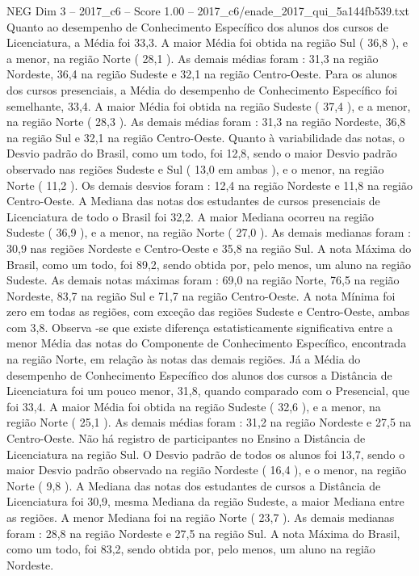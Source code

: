 \begin{textsample}{NEG Dim 3 – 2017\_c6 – Score 1.00 – 2017\_c6/enade\_2017\_qui\_5a144fb539.txt}
Quanto ao desempenho de Conhecimento Específico dos alunos dos cursos de Licenciatura, a Média foi 33,3.
A maior Média foi obtida na região Sul ( 36,8 ), e a menor, na região Norte ( 28,1 ).
As demais médias foram : 31,3 na região Nordeste, 36,4 na região Sudeste e 32,1 na região Centro-Oeste.
Para os alunos dos cursos presenciais, a Média do desempenho de Conhecimento Específico foi semelhante, 33,4.
A maior Média foi obtida na região Sudeste ( 37,4 ), e a menor, na região Norte ( 28,3 ).
As demais médias foram : 31,3 na região Nordeste, 36,8 na região Sul e 32,1 na região Centro-Oeste.
Quanto à variabilidade das notas, o Desvio padrão do Brasil, como um todo, foi 12,8, sendo o maior Desvio padrão observado nas regiões Sudeste e Sul ( 13,0 em ambas ), e o menor, na região Norte ( 11,2 ).
Os demais desvios foram : 12,4 na região Nordeste e 11,8 na região Centro-Oeste.
A Mediana das notas dos estudantes de cursos presenciais de Licenciatura de todo o Brasil foi 32,2.
A maior Mediana ocorreu na região Sudeste ( 36,9 ), e a menor, na região Norte ( 27,0 ).
As demais medianas foram : 30,9 nas regiões Nordeste e Centro-Oeste e 35,8 na região Sul.
A nota Máxima do Brasil, como um todo, foi 89,2, sendo obtida por, pelo menos, um aluno na região Sudeste.
As demais notas máximas foram : 69,0 na região Norte, 76,5 na região Nordeste, 83,7 na região Sul e 71,7 na região Centro-Oeste.
A nota Mínima foi zero em todas as regiões, com exceção das regiões Sudeste e Centro-Oeste, ambas com 3,8.
Observa -se que existe diferença estatisticamente significativa entre a menor Média das notas do Componente de Conhecimento Específico, encontrada na região Norte, em relação às notas das demais regiões.
Já a Média do desempenho de Conhecimento Específico dos alunos dos cursos a Distância de Licenciatura foi um pouco menor, 31,8, quando comparado com o Presencial, que foi 33,4.
A maior Média foi obtida na região Sudeste ( 32,6 ), e a menor, na região Norte ( 25,1 ).
As demais médias foram : 31,2 na região Nordeste e 27,5 na Centro-Oeste.
Não há registro de participantes no Ensino a Distância de Licenciatura na região Sul.
O Desvio padrão de todos os alunos foi 13,7, sendo o maior Desvio padrão observado na região Nordeste ( 16,4 ), e o menor, na região Norte ( 9,8 ).
A Mediana das notas dos estudantes de cursos a Distância de Licenciatura foi 30,9, mesma Mediana da região Sudeste, a maior Mediana entre as regiões.
A menor Mediana foi na região Norte ( 23,7 ).
As demais medianas foram : 28,8 na região Nordeste e 27,5 na região Sul.
A nota Máxima do Brasil, como um todo, foi 83,2, sendo obtida por, pelo menos, um aluno na região Nordeste.

\end{textsample}
